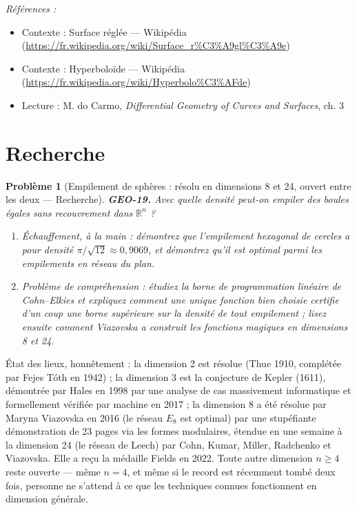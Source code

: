 \documentclass[11pt]{article}
\newtheorem{problem}{Problème}
\newenvironment{refs}{\par\small\noindent\emph{Références :}\begin{itemize}\setlength\itemsep{0pt}}{\end{itemize}\normalsize}
\begin{document}
\begin{refs}
\item Contexte : Surface réglée --- Wikipédia (\url{https://fr.wikipedia.org/wiki/Surface_r%C3%A9gl%C3%A9e})
\item Contexte : Hyperboloïde --- Wikipédia (\url{https://fr.wikipedia.org/wiki/Hyperbolo%C3%AFde})
\item Lecture : M. do Carmo, \textit{Differential Geometry of Curves and Surfaces}, ch. 3
\end{refs}

\bigskip


\section*{Recherche}

\begin{problem}[{Empilement de sphères : résolu en dimensions 8 et 24, ouvert entre les deux --- Recherche}]
\textbf{GEO-19.} Avec quelle densité peut-on empiler des boules égales sans recouvrement dans
$ \mathbb{R}^n $ ?
\begin{enumerate}
\item[(a)] Échauffement, à la main : démontrez que l'empilement hexagonal de cercles a pour densité
$ \pi/\sqrt{12} \approx 0{,}9069 $, et démontrez qu'il est optimal parmi les empilements
\textit{en réseau} du plan.
\item[(b)] Problème de compréhension : étudiez la borne de programmation linéaire de Cohn--Elkies et
expliquez comment une unique fonction bien choisie certifie d'un coup une borne supérieure sur la
densité de tout empilement ; lisez ensuite comment Viazovska a construit les fonctions magiques en
dimensions 8 et 24.
\end{enumerate}

\end{problem}

\noindent État des lieux, honnêtement : la dimension 2 est résolue (Thue 1910, complétée
par Fejes Tóth en 1942) ; la dimension 3 est la conjecture de Kepler (1611), démontrée par Hales en
1998 par une analyse de cas massivement informatique et formellement vérifiée par machine en 2017 ;
la dimension 8 a été résolue par Maryna Viazovska en 2016 (le réseau $ E_8 $ est optimal) par une
stupéfiante démonstration de 23 pages via les formes modulaires, étendue en une semaine à la
dimension 24 (le réseau de Leech) par Cohn, Kumar, Miller, Radchenko et Viazovska. Elle a reçu la
médaille Fields en 2022. Toute autre dimension $ n \ge 4 $ reste ouverte --- même $ n = 4 $, et
même si le record est \og{} récemment tombé \fg{} deux fois, personne ne s'attend à ce que les techniques
connues fonctionnent en dimension générale.
\end{document}

